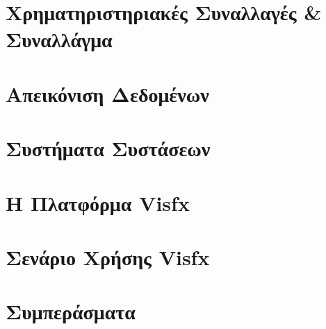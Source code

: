\documentclass[a4paper,11pt,twoside]{book}
\author{\me}
\begin{document}
\setcounter{page}{3}



\clearemptydoublepage



\clearemptydoublepage



\clearemptydoublepage



\clearemptydoublepage



\clearemptydoublepage

\pagestyle{fancy}

\tableofcontents
\clearemptydoublepage

\setcounter{page}{1}


\clearemptydoublepage

\chapter{Χρηματηριστηριακές Συναλλαγές \& Συναλλάγμα}\label{ch:chap1}

\clearemptydoublepage

\chapter{Απεικόνιση Δεδομένων}\label{ch:chap2}

\clearemptydoublepage

\chapter{Συστήματα Συστάσεων}\label{ch:chap3}

\clearemptydoublepage

\chapter{Η Πλατφόρμα Visfx}\label{ch:chap4}

\clearemptydoublepage

\chapter{Σενάριο Χρήσης Visfx}\label{ch:chap4}

\clearemptydoublepage

\chapter{Συμπεράσματα}\label{ch:chap4}

\clearemptydoublepage


\clearemptydoublepage


\end{document}
